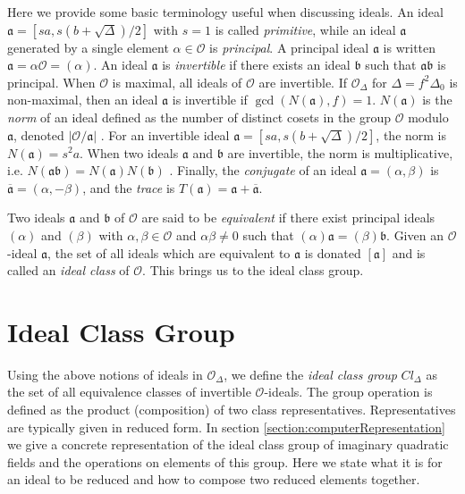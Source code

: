 \documentclass{ucalgthes1}
\theoremstyle{plain}
\theoremstyle{definition}
\newcommand{\OO}{\mathcal{O}}
\begin{document}
Here we provide some basic terminology useful when discussing ideals.  An ideal $\mathfrak{a} = [sa, s(b+\sqrt{\Delta})/2]$ with $s=1$ is called \emph{primitive}, while an ideal $\mathfrak{a}$ generated by a single element $\alpha \in \OO$ is \emph{principal}. A principal ideal $\mathfrak a$ is written $\mathfrak{a} = \alpha \OO = (\alpha)$.  An ideal $\mathfrak{a}$ is \emph{invertible} if there exists an ideal $\mathfrak{b}$ such that $\mathfrak{a}\mathfrak{b}$ is principal.  When $\OO$ is maximal, all ideals of $\OO$ are invertible.  If $\OO_\Delta$ for $\Delta = f^2\Delta_0$ is non-maximal, then an ideal $\mathfrak{a}$ is invertible if $\gcd(N(\mathfrak{a}),f)=1$.  $N(\mathfrak{a})$ is the \emph{norm} of an ideal defined as the number of distinct cosets in the group $\OO$ modulo $\mathfrak{a}$, denoted $|\OO/\mathfrak{a}|$ \cite[pp.~90-91]{Jac09}.  For an invertible ideal $\mathfrak{a} = [sa, s(b+\sqrt{\Delta})/2]$, the norm is $N(\mathfrak{a}) = s^2a$.  When two ideals $\mathfrak{a}$ and $\mathfrak{b}$ are invertible, the norm is multiplicative, i.e. $N(\mathfrak{a}\mathfrak{b}) = N(\mathfrak{a})N(\mathfrak{b})$ \cite[p.~92]{Jac09}.  Finally, the \emph{conjugate} of an ideal $\mathfrak{a} = (\alpha, \beta)$ is $\overline{\mathfrak{a}} = (\alpha, -\beta)$, and the \emph{trace} is $T(\mathfrak a) = \mathfrak a + \overline{\mathfrak a}$.

Two ideals $\mathfrak{a}$ and $\mathfrak{b}$ of $\OO$ are said to be \emph{equivalent} if there exist principal ideals $(\alpha)$ and $(\beta)$ with  $\alpha, \beta \in \OO$ and $\alpha\beta \neq 0$ such that $(\alpha)\mathfrak{a} = (\beta)\mathfrak{b}$.  Given an $\OO$-ideal $\mathfrak{a}$, the set of all ideals which are equivalent to $\mathfrak{a}$ is donated $[\mathfrak{a}]$ and is called an \emph{ideal class} of $\OO$.  This brings us to the ideal class group.


\bigbreak
\section{Ideal Class Group}

Using the above notions of ideals in $\OO_\Delta$, we define the \emph{ideal class group} $Cl_\Delta$ as the set of all equivalence classes of invertible $\OO$-ideals.  The group operation is defined as the product (composition) of two class representatives.  Representatives are typically given in reduced form.  In section \ref{section:computerRepresentation} we give a concrete representation of the ideal class group of imaginary quadratic fields and the operations on elements of this group.  Here we state what it is for an ideal to be reduced and how to compose two reduced elements together.
\end{document}
